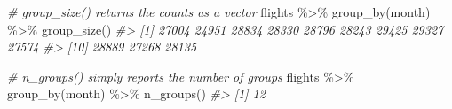 \documentclass[
]{book}
\newenvironment{Shaded}{\begin{snugshade}}{\end{snugshade}}
\newcommand{\CommentTok}[1]{\textcolor[rgb]{0.56,0.35,0.01}{\textit{#1}}}
\newcommand{\FunctionTok}[1]{\textcolor[rgb]{0.00,0.00,0.00}{#1}}
\newcommand{\NormalTok}[1]{#1}
\newcommand{\SpecialCharTok}[1]{\textcolor[rgb]{0.00,0.00,0.00}{#1}}
\begin{document}
\begin{Shaded}
\begin{Highlighting}[]
\CommentTok{\# group\_size() returns the counts as a vector}
\NormalTok{flights }\SpecialCharTok{\%\textgreater{}\%} \FunctionTok{group\_by}\NormalTok{(month) }\SpecialCharTok{\%\textgreater{}\%} \FunctionTok{group\_size}\NormalTok{()}
\CommentTok{\#\textgreater{}  [1] 27004 24951 28834 28330 28796 28243 29425 29327 27574}
\CommentTok{\#\textgreater{} [10] 28889 27268 28135}

\CommentTok{\# n\_groups() simply reports the number of groups}
\NormalTok{flights }\SpecialCharTok{\%\textgreater{}\%} \FunctionTok{group\_by}\NormalTok{(month) }\SpecialCharTok{\%\textgreater{}\%} \FunctionTok{n\_groups}\NormalTok{()}
\CommentTok{\#\textgreater{} [1] 12}
\end{Highlighting}
\end{Shaded}
\end{document}
